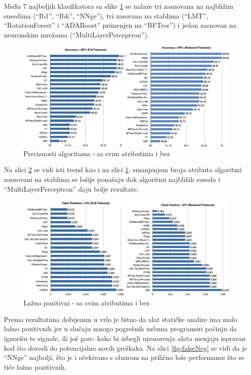 \documentclass[a4paper]{article}
\begin{document}
Među 7 najboljih klasifikatora sa slike \ref{fig:acc} se nalaze tri zasnovana na najbližim susedima (``Ib1'', ``Ibk'', ``NNge''), tri zasovana na stablima
(``LMT'', ``RotationForest'' i ``ADABoost'' primenjen na ``BFTree'') i jedan zasnovan na neuronskim mrežama (``MultiLayerPerceptron'').


\begin{figure}[h!]
\centering
\includegraphics[width=\textwidth]{accuracy.png}
\caption{Preciznosti algoritama - sa svim atributima i bez}
\label{fig:acc}
\end{figure}

Na slici  \ref{fig:falsePos} se vidi isti trend kao i na slici  \ref{fig:acc}: smanjenjem broja atributa algoritmi zasnovani na stablima se lošije ponašaju dok algoritmi najbližih suseda i ``MultiLayerPerceptron'' daju bolje rezultate.

\begin{figure}[h!]
\centering
\includegraphics[width=\textwidth]{false_positive.png}
\caption{Lažno pozitivni - sa svim atributima i bez}
\label{fig:falsePos}
\end{figure}

Prema rezultatima dobijenim u  \cite{baca} vrlo je bitno da alat statičke analize ima malo lažno pozitivnih jer
u slučaju mnogo pogrešnih uzbuna programeri počinju da ignorišu te signale, ili još gore: kako bi izbegli upozorenja alata menjaju ispravan kod što dovodi do potencijalno
 novih greškaka. Na slici \ref{fig:falseNeg} se vidi da je ``NNge'' najbolji, što je i očekivano s obzirom na prilično
loše performanse što se tiče lažno pozitivnih.
\end{document}
